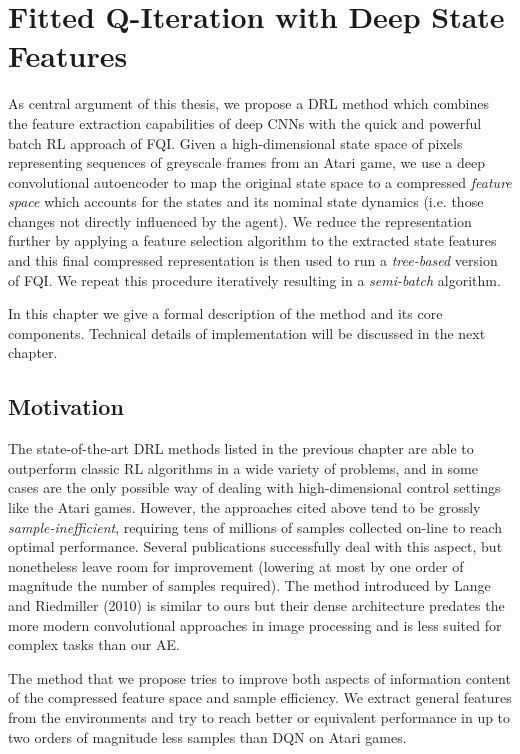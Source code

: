 \chapter{Fitted Q-Iteration with Deep State Features}
\label{ch3_setup}
\thispagestyle{empty}

\vspace{0.5cm}

As central argument of this thesis, we propose a DRL method which 
combines the feature extraction capabilities of deep CNNs with the quick 
and powerful batch RL approach of FQI. 
Given a high-dimensional state space of pixels representing sequences of 
greyscale frames from an Atari game, we use a deep convolutional autoencoder 
to map the original state space to a compressed \textit{feature space} which 
accounts for the states and its nominal state dynamics (i.e. those changes not
directly influenced by the agent). We reduce the representation further by 
applying a feature selection algorithm to the extracted state features and this 
final compressed representation is then used to run a \textit{tree-based} 
version of FQI. We repeat this procedure iteratively resulting in a 
\textit{semi-batch} algorithm. 

In this chapter we give a formal description of the method and its core 
components. Technical details of implementation will be discussed in the next
chapter.

\section{Motivation}
The state-of-the-art DRL methods listed in the previous chapter are able to 
outperform classic RL algorithms in a wide variety of problems, and in some 
cases are the only possible way of dealing with high-dimensional control 
settings like the Atari games. 
However, the approaches cited above tend to be grossly 
\textit{sample-inefficient}, requiring tens of millions of samples collected
on-line to reach optimal performance. Several publications successfully deal 
with this aspect, but nonetheless leave room for improvement (lowering at most
by one order of magnitude the number of samples required).
The method introduced by Lange and Riedmiller (2010) \cite{lange2010deep} is 
similar to ours but their dense architecture predates the more modern 
convolutional approaches in image processing and is less suited for complex
tasks than our AE.

The method that we propose tries to improve both aspects of information content
of the compressed feature space and sample efficiency. We extract general 
features from the environments and try to reach better or equivalent performance
in up to two orders of magnitude less samples than DQN on Atari games.

